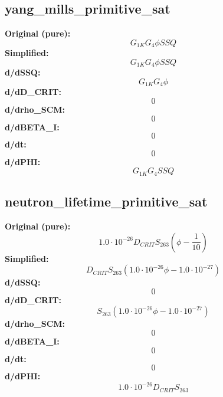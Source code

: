 \subsection{yang_mills_primitive_sat}
\textbf{Original (pure):}
\begin{equation}
G_{1 K} G_{4} \phi SSQ
\end{equation}
\textbf{Simplified:}
\begin{equation}
G_{1 K} G_{4} \phi SSQ
\end{equation}
\textbf{d/dSSQ:}
\begin{equation}
G_{1 K} G_{4} \phi
\end{equation}
\textbf{d/dD_CRIT:}
\begin{equation}
0
\end{equation}
\textbf{d/drho_SCM:}
\begin{equation}
0
\end{equation}
\textbf{d/dBETA_I:}
\begin{equation}
0
\end{equation}
\textbf{d/dt:}
\begin{equation}
0
\end{equation}
\textbf{d/dPHI:}
\begin{equation}
G_{1 K} G_{4} SSQ
\end{equation}

\subsection{neutron_lifetime_primitive_sat}
\textbf{Original (pure):}
\begin{equation}
1.0 \cdot 10^{-26} D_{CRIT} S_{26 3} \left(\phi - \frac{1}{10}\right)
\end{equation}
\textbf{Simplified:}
\begin{equation}
D_{CRIT} S_{26 3} \left(1.0 \cdot 10^{-26} \phi - 1.0 \cdot 10^{-27}\right)
\end{equation}
\textbf{d/dSSQ:}
\begin{equation}
0
\end{equation}
\textbf{d/dD_CRIT:}
\begin{equation}
S_{26 3} \left(1.0 \cdot 10^{-26} \phi - 1.0 \cdot 10^{-27}\right)
\end{equation}
\textbf{d/drho_SCM:}
\begin{equation}
0
\end{equation}
\textbf{d/dBETA_I:}
\begin{equation}
0
\end{equation}
\textbf{d/dt:}
\begin{equation}
0
\end{equation}
\textbf{d/dPHI:}
\begin{equation}
1.0 \cdot 10^{-26} D_{CRIT} S_{26 3}
\end{equation}

